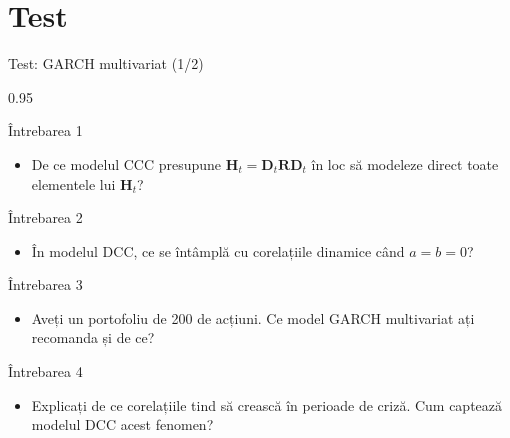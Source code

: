 \documentclass[9pt, aspectratio=169, t]{beamer}
\begin{document}
\section{Test}

\begin{frame}{Test: GARCH multivariat (1/2)}
    \begin{cminipage}{0.95\textwidth}
    {\footnotesize
    \begin{block}{Întrebarea 1}
        \begin{itemize}\setlength{\itemsep}{0pt}
            \item De ce modelul CCC presupune $\mathbf{H}_t = \mathbf{D}_t\mathbf{R}\mathbf{D}_t$ în loc să modeleze direct toate elementele lui $\mathbf{H}_t$?
        \end{itemize}
    \end{block}
    \begin{block}{Întrebarea 2}
        \begin{itemize}\setlength{\itemsep}{0pt}
            \item În modelul DCC, ce se întâmplă cu corelațiile dinamice când $a = b = 0$?
        \end{itemize}
    \end{block}
    \begin{block}{Întrebarea 3}
        \begin{itemize}\setlength{\itemsep}{0pt}
            \item Aveți un portofoliu de 200 de acțiuni. Ce model GARCH multivariat ați recomanda și de ce?
        \end{itemize}
    \end{block}
    \begin{block}{Întrebarea 4}
        \begin{itemize}\setlength{\itemsep}{0pt}
            \item Explicați de ce corelațiile tind să crească în perioade de criză. Cum captează modelul DCC acest fenomen?
        \end{itemize}
    \end{block}
    }
    \end{cminipage}
\end{frame}
\end{document}
